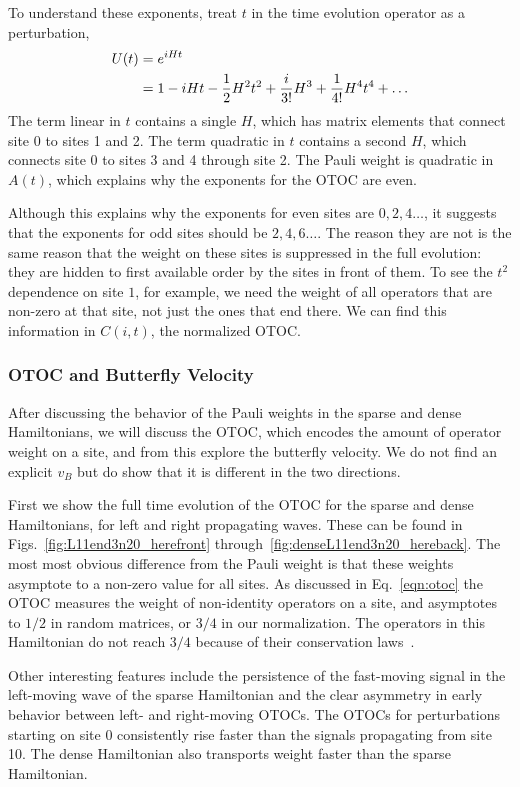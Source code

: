 To understand these exponents, treat $t$ in the time evolution operator as a perturbation,
\begin{align}
U(t) &= e^{iHt}\nonumber\\
&= 1-iHt-\frac{1}{2} H^2t^2+\frac{i}{3!}H^3+\frac{1}{4!}H^4t^4+\dots\label{eqn:expansion}
\end{align}
The term linear in $t$ contains a single $H$, which has matrix elements that connect site 0 to sites 1 and 2. The term quadratic in $t$ contains a second $H$, which connects site 0 to sites 3 and 4 through site 2. The Pauli weight is quadratic in $A(t)$, which explains why the exponents for the OTOC are even.

Although this explains why the exponents for even sites are $0,2,4\dots$, it suggests that the exponents for odd sites should be $2,4,6\dots$. The reason they are not is the same reason that the weight on these sites is suppressed in the full evolution: they are hidden to first available order by the sites in front of them. To see the $t^2$ dependence on site $1$, for example, we need the weight of all operators that are non-zero at that site, not just the ones that end there. We can find this information in $C(i,t)$, the normalized OTOC.

\subsubsection{OTOC and Butterfly Velocity} \label{subsub:otoc}

After discussing the behavior of the Pauli weights in the sparse and dense Hamiltonians, we will discuss the OTOC, which encodes the amount of operator weight on a site, and from this explore the butterfly velocity. We do not find an explicit $v_B$ but do show that it is different in the two directions. 

First we show the full time evolution of the OTOC for the sparse and dense Hamiltonians, for left and right propagating waves. These can be found in Figs.~\ref{fig:L11end3n20_herefront} through~\ref{fig:denseL11end3n20_hereback}. The most most obvious difference from the Pauli weight is that these weights asymptote to a non-zero value for all sites. As discussed in Eq.~\ref{eqn:otoc} the OTOC measures the weight of non-identity operators on a site, and asymptotes to $1/2$ in random matrices, or $3/4$ in our normalization. The operators in this Hamiltonian do not reach $3/4$ because of their conservation laws~\cite{Jonay17, Jonay18}.

Other interesting features include the persistence of the fast-moving signal in the left-moving wave of the sparse Hamiltonian and the clear asymmetry in early behavior between left- and right-moving OTOCs. The OTOCs for perturbations starting on site 0 consistently rise faster than the signals propagating from site 10. The dense Hamiltonian also transports weight faster than the sparse Hamiltonian.

